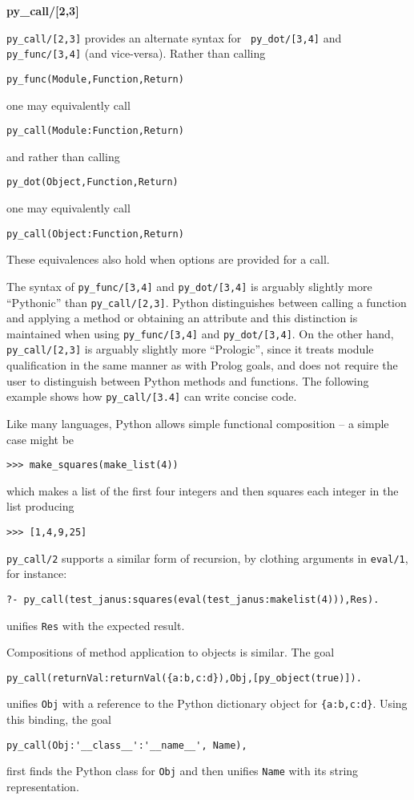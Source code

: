 \begin{example} {\bf py\_call/[2,3]} \rm \label{jns-examp:pycall}

\noindent
    {\tt py\_call/[2,3]} provides an alternate syntax for {\tt
      py\_dot/[3,4]} and {\tt py\_func/[3,4]} (and vice-versa).
    Rather than calling

{\tt py\_func(Module,Function,Return)}

\noindent
one may equivalently call 

{\tt py\_call(Module:Function,Return)}

\noindent
and rather than calling 

{\tt py\_dot(Object,Function,Return)}

\noindent
one may equivalently call 

{\tt py\_call(Object:Function,Return)}

\noindent
These equivalences also hold when options are provided for a call.
\end{example}

The syntax of {\tt py\_func/[3,4]} and {\tt py\_dot/[3,4]} is arguably
slightly more ``Pythonic'' than {\tt py\_call/[2,3]}.  Python
distinguishes between calling a function and applying a method or
obtaining an attribute and this distinction is maintained when using
{\tt py\_func/[3,4]} and {\tt py\_dot/[3,4]}.  On the other hand, {\tt
  py\_call/[2,3]} is arguably slightly more ``Prologic'', since it
treats module qualification in the same manner as with Prolog goals,
and does not require the user to distinguish between Python methods
and functions.  The following example shows how {\tt py\_call/[3.4]}
can write concise code.

\begin{example} \rm
  Like many languages, Python allows simple functional composition --
  a simple case might be
\begin{verbatim}
>>> make_squares(make_list(4))
\end{verbatim}              
which makes a list of the first four integers and then squares each
 integer in the list producing
 \begin{verbatim}
>>> [1,4,9,25]
\end{verbatim}
     {\tt py\_call/2} supports a similar form of recursion, by clothing arguments in {\tt eval/1}, for instance:
\begin{verbatim}
?- py_call(test_janus:squares(eval(test_janus:makelist(4))),Res).
\end{verbatim}
unifies {\tt Res} with the expected result.

Compositions of method application to objects is similar.  The
goal
\begin{verbatim}
py_call(returnVal:returnVal({a:b,c:d}),Obj,[py_object(true)]).
\end{verbatim}
unifies {\tt Obj} with a reference to the Python dictionary object for
{\tt \{a:b,c:d\}}.  Using this binding, the goal
\begin{verbatim}
py_call(Obj:'__class__':'__name__', Name),
\end{verbatim}
first finds the Python class for {\tt Obj} and then unifies {\tt Name}
with its string representation.
\end{example}

